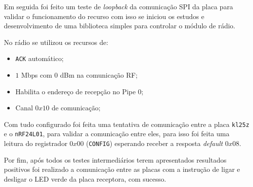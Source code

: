     Em seguida foi feito um teste de \textit{loopback} da comunicação SPI da placa para validar o funcionamento do recurso com isso se iniciou os estudos e desenvolvimento de uma biblioteca simples para controlar o módulo de rádio.

    No rádio se utilizou os recursos de:

    \begin{itemize}
        \item \texttt{ACK} automático;
        \item \(1\) Mbps com \(0\) dBm na comunicação RF;
        \item Habilita o endereço de recepção no Pipe 0;
        \item Canal \(0x10\) de comunicação;
    \end{itemize}

    Com tudo configurado foi feita uma tentativa de comunicação entre a placa \texttt{kl25z} e o \texttt{nRF24L01}, para validar a comunicação entre eles, para isso foi feita uma leitura do registrador \(0x00\) (\texttt{CONFIG}) esperando receber a resposta \textit{default} \(0x08\).

    Por fim, após todos os testes intermediários terem apresentados resultados positivos foi realizado a comunicação entre as placas com a instrução de ligar e desligar o LED verde da placa receptora, com sucesso.
    
